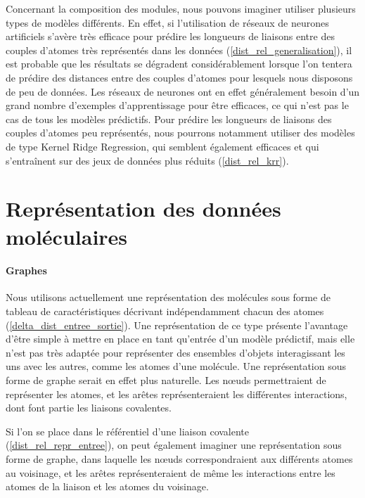 \par Concernant la composition des modules, nous pouvons imaginer utiliser plusieurs types de modèles différents. En effet, si l'utilisation de réseaux de neurones artificiels s'avère très efficace pour prédire les longueurs de liaisons entre des couples d'atomes très représentés dans les données (\ref{dist_rel_generalisation}), il est probable que les résultats se dégradent considérablement lorsque l'on tentera de prédire des distances entre des couples d'atomes pour lesquels nous disposons de peu de données. Les réseaux de neurones ont en effet généralement besoin d'un grand nombre d'exemples d'apprentissage pour être efficaces, ce qui n'est pas le cas de tous les modèles prédictifs. Pour prédire les longueurs de liaisons des couples d'atomes peu représentés, nous pourrons notamment utiliser des modèles de type Kernel Ridge Regression, qui semblent également efficaces et qui s'entraînent sur des jeux de données plus réduits (\ref{dist_rel_krr}).\\


\section{Représentation des données moléculaires}

\label{perspectives_representation}
		
\paragraph{Graphes} Nous utilisons actuellement une représentation des molécules sous forme de tableau de caractéristiques décrivant indépendamment chacun des atomes (\ref{delta_dist_entree_sortie}). Une représentation de ce type présente l'avantage d'être simple à mettre en place en tant qu'entrée d'un modèle prédictif, mais elle n'est pas très adaptée pour représenter des ensembles d'objets interagissant les uns avec les autres, comme les atomes d'une molécule. Une représentation sous forme de graphe serait en effet plus naturelle. Les nœuds permettraient de représenter les atomes, et les arêtes représenteraient les différentes interactions, dont font partie les liaisons covalentes.
\par Si l'on se place dans le référentiel d'une liaison covalente (\ref{dist_rel_repr_entree}), on peut également imaginer une représentation sous forme de graphe, dans laquelle les nœuds correspondraient aux différents atomes au voisinage, et les arêtes représenteraient de même les interactions entre les atomes de la liaison et les atomes du voisinage.

